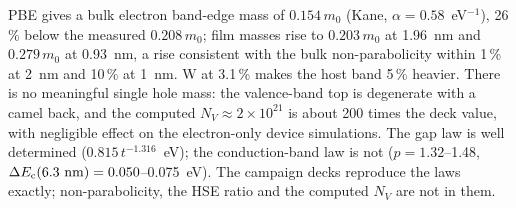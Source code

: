\begin{keyresult}
PBE gives a bulk electron band-edge mass of $0.154\,m_0$ (Kane, $\alpha = 0.58$~eV$^{-1}$), 26\,\% below the measured
$0.208\,m_0$; film masses rise to $0.203\,m_0$ at 1.96~nm and $0.279\,m_0$ at 0.93~nm, a rise consistent with the bulk
non-parabolicity within 1\,\% at 2~nm and 10\,\% at 1~nm. W at 3.1\,\% makes the host band 5\,\% heavier. There is no meaningful single hole mass: the valence-band
top is degenerate with a camel back, and the computed $N_V \approx 2\times10^{21}$\cmcu{} is about 200 times the deck
value, with negligible effect on the electron-only device simulations. The gap law is well determined
($0.815\,t^{-1.316}$~eV); the conduction-band law is not ($p = 1.32$--1.48, $\Delta E_{\mathrm{c}}(6.3~\mathrm{nm}) = 0.050$--0.075~eV). The
campaign decks reproduce the laws exactly; non-parabolicity, the HSE ratio and the computed $N_V$ are not in them.
\end{keyresult}
